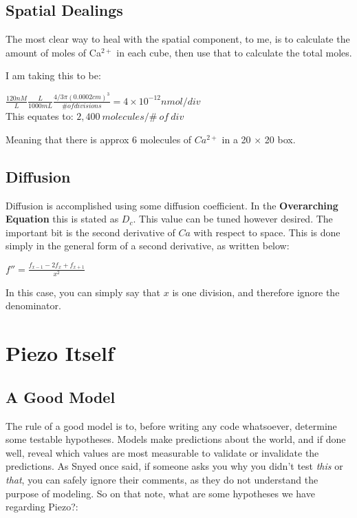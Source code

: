 \documentclass[12pt]{amsart}
\begin{document}
 
\subsection{Spatial Dealings} The most clear way to heal with the spatial component, to me, is to calculate the amount of moles of Ca$^{2+}$ in each cube, then use that to calculate the total moles.\newline

I am taking this to be: 

\bigskip

\begin{center}
    $\frac{120nM}{L}\frac{L}{1000mL}\frac{4/3\pi(0.0002cm)^3}{\# of divisions} = 4\times10^{-12} nmol/div$\\
    This equates to: 
    $2,400 \: molecules / \# \: of \: div$
\end{center}

\bigskip

Meaning that there is approx 6 molecules of $Ca^{2+}$ in a 20 $\times$ 20 box.

\subsection{Diffusion} Diffusion is accomplished using some diffusion coefficient. In the \textbf{Overarching Equation} this is stated as $D_c$. This value can be tuned however desired. The important bit is the second derivative of $Ca$ with respect to space. This is done simply in the general form of a second derivative, as written below: 

\begin{center}

    $f'' = \frac{f_{x - 1} - 2f_x + f_{x + 1}}{x^2}$
    
\end{center}

\bigskip

In this case, you can simply say that $x$ is one division, and therefore ignore the denominator. 


 \section{Piezo Itself}

 \subsection{A Good Model} The rule of a good model is to, before writing any code whatsoever, determine some testable hypotheses. Models make predictions about the world, and if done well, reveal which values are most measurable to validate or invalidate the predictions. As Snyed once said, if someone asks you why you didn't test \textit{this} or \textit{that}, you can safely ignore their comments, as they do not understand the purpose of modeling. So on that note, what are some hypotheses we have regarding Piezo?:\newline
\end{document}

